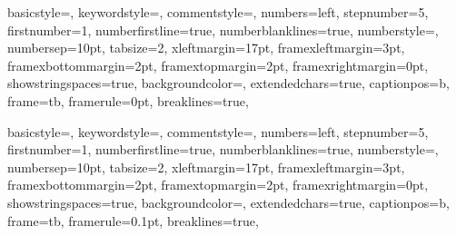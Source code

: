 \documentclass[a4paper,onecolumn,oneside,12pt,wide,floatssmall]{mwrep} %
\theoremstyle{definition}
\theoremstyle{plain}%
\theoremstyle{remark}
\begin{document}
{
basicstyle={\footnotesize},
keywordstyle={\bf\footnotesize\color{black}},
commentstyle={\em\footnotesize\color{gray}},
numbers=left,
stepnumber=5,
firstnumber=1,
numberfirstline=true,
numberblanklines=true,
numberstyle={\sf\tiny},
numbersep=10pt,
tabsize=2,
xleftmargin=17pt,
framexleftmargin=3pt,
framexbottommargin=2pt,
framextopmargin=2pt,
framexrightmargin=0pt,
showstringspaces=true,
backgroundcolor={\color{ListingBackground}},
extendedchars=true,
captionpos=b,
frame=tb,
framerule=0pt,
breaklines=true,
}

{
basicstyle={\footnotesize},
keywordstyle={\bf\footnotesize\color{black}},
commentstyle={\em\footnotesize\color{gray}},
numbers=left,
stepnumber=5,
firstnumber=1,
numberfirstline=true,
numberblanklines=true,
numberstyle={\sf\tiny},
numbersep=10pt,
tabsize=2,
xleftmargin=17pt,
framexleftmargin=3pt,
framexbottommargin=2pt,
framextopmargin=2pt,
framexrightmargin=0pt,
showstringspaces=true,
backgroundcolor={\color{ListingBackground}},
extendedchars=true,
captionpos=b,
frame=tb,
framerule=0.1pt,
breaklines=true,
}

\renewcommand{\baselinestretch}{1.0}
\raggedbottom

\tableofcontents

\newpage
{}
\setcounter{page}{1}









\appendix
%



\listoffigures

\lstlistoflistings
{}

%



\end{document}
